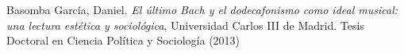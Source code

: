 \renewcommand\refname{Referencias}
	\begin{thebibliography}{00}
			
%			
			{ Basomba Garc\'ia, Daniel.} 
			\textit{El \'ultimo Bach y el dodecafonismo como ideal musical: una lectura est\'etica y sociol\'ogica},
			Universidad Carlos III de Madrid.
			Tesis Doctoral en Ciencia Pol\'itica y Sociolog\'ia
			(2013)
			
			
			

						
	\end{thebibliography}